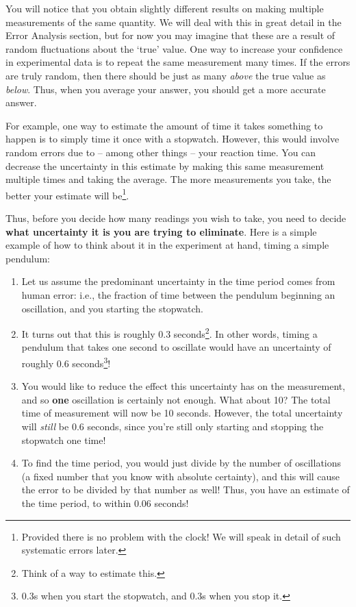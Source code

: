 You will notice that you obtain slightly different results on making multiple measurements of the same quantity. We will deal with this in great detail in the {\color{red}Error Analysis} section, but for now you may imagine that these are a result of random fluctuations about the `true' value. One way to increase your confidence in experimental data is to repeat the same measurement many times. If the errors are truly random, then there should be just as many \textit{above} the true value as \textit{below}. Thus, when you average your answer, you should get a more accurate answer.

For example, one way to estimate the amount of time it takes something to happen is to simply time it once with a stopwatch. However, this would involve random errors due to -- among other things -- your reaction time. You can decrease the uncertainty in this estimate by making this same measurement multiple times and taking the average. The more measurements you take, the better your estimate will be\footnote{Provided there is no problem with the clock! We will speak in detail of such systematic errors later.}.

Thus, before you decide how many readings you wish to take, you need to decide \textbf{what uncertainty it is you are trying to eliminate}. Here is a simple example of how to think about it in the experiment at hand, timing a simple pendulum:

\begin{enumerate}
    \item Let us assume the predominant uncertainty in the time period comes from human error: i.e., the fraction of time between the pendulum beginning an oscillation, and you starting the stopwatch.
    
    \item It turns out that this is roughly 0.3 seconds\footnote{Think of a way to estimate this.}. In other words, timing a pendulum that takes one second to oscillate would have an uncertainty of roughly 0.6 seconds\footnote{0.3s when you start the stopwatch, and 0.3s when you stop it.}! 
    
    \item You would like to reduce the effect this uncertainty has on the measurement, and so \textbf{one} oscillation is certainly not enough. What about 10? The total time of measurement will now be 10 seconds. However, the total uncertainty will \textit{still} be 0.6 seconds, since you're still only starting and stopping the stopwatch one time! 
    
    \item To find the time period, you would just divide by the number of oscillations (a fixed number that you know with absolute certainty), and this will cause the error to be divided by that number as well! Thus, you have an estimate of the time period, to within 0.06 seconds!
\end{enumerate}

